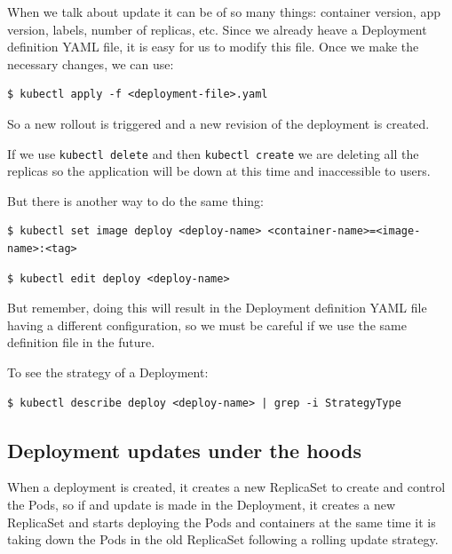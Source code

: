 \documentclass{article}
\newenvironment{blocktemplateIII}[1]{%
    \tcolorbox[beamer,%
    noparskip,breakable,
    ,colframe=Red,%
    colbacklower=LimeGreen!75!LightGreen,%
    title=#1]}%
    {\endtcolorbox}
\newenvironment{codetemplate}[1][]{%
  \mybasecolorbox[#1]
  \itshape
}{%
  \endmybasecolorbox
}
\begin{document}
When we talk about update it can be of so many things: container version, app version, labels, number of replicas, etc. Since we already heave a Deployment definition YAML file, it is easy for us to modify this file. Once we make the necessary changes, we can use:

\begin{codetemplate}{}
\begin{verbatim}
$ kubectl apply -f <deployment-file>.yaml
\end{verbatim}
\end{codetemplate}

So a new rollout is triggered and a new revision  of the deployment is created.

\begin{blocktemplateIII}{WARNING}
If we use \verb|kubectl delete| and then \verb|kubectl create| we are deleting all the replicas so the application will be down at this time and inaccessible to users.
\end{blocktemplateIII}

But there is another way to do the same thing:

\begin{codetemplate}{}
\begin{verbatim}
$ kubectl set image deploy <deploy-name> <container-name>=<image-name>:<tag>
\end{verbatim}
\end{codetemplate}

\begin{codetemplate}{}
\begin{verbatim}
$ kubectl edit deploy <deploy-name>
\end{verbatim}
\end{codetemplate}

\begin{blocktemplateIII}{WARNING}
But remember, doing this will result in the Deployment definition YAML file having a different configuration, so we must be careful if we use the same definition file in the future.
\end{blocktemplateIII}

To see the strategy of a Deployment:
\begin{codetemplate}{}
\begin{verbatim}
$ kubectl describe deploy <deploy-name> | grep -i StrategyType
\end{verbatim}
\end{codetemplate}

\subsection{Deployment updates under the hoods}
When a deployment is created, it creates a new ReplicaSet to create and control the Pods, so if and update is made in the Deployment, it creates a new ReplicaSet and starts deploying the Pods and containers at the same time it is taking down the Pods in the old ReplicaSet following a rolling update strategy.
\end{document}
